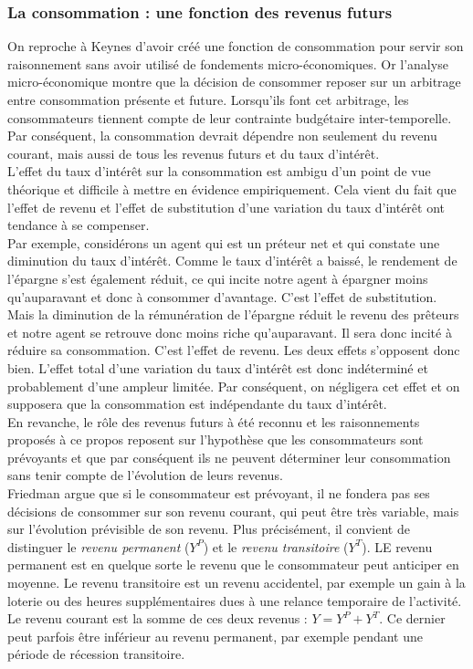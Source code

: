 \documentclass[10pt]{book}
\begin{document}
\subsubsection{La consommation : une fonction des revenus futurs}
On reproche à Keynes d'avoir créé une fonction de consommation pour servir son raisonnement sans avoir utilisé de fondements micro-économiques. Or l'analyse micro-économique montre que la décision de consommer reposer sur un arbitrage entre consommation présente et future. Lorsqu'ils font cet arbitrage, les consommateurs tiennent compte de leur contrainte budgétaire inter-temporelle. Par conséquent, la consommation devrait dépendre non seulement du revenu courant, mais aussi de tous les revenus futurs et du taux d'intérêt. \\
L'effet du taux d'intérêt sur la consommation est ambigu d'un point de vue théorique et difficile à mettre en évidence empiriquement. Cela vient du fait que l'effet de revenu et l'effet de substitution d'une variation du taux d'intérêt ont tendance à se compenser. \\
Par exemple, considérons un agent qui est un préteur net et qui constate une diminution du taux d'intérêt. Comme le taux d'intérêt a baissé, le rendement de l'épargne s'est également réduit, ce qui incite notre agent à épargner moins qu'auparavant et donc à consommer d'avantage. C'est l'effet de substitution. Mais la diminution de la rémunération de l'épargne réduit le revenu des prêteurs et notre agent se retrouve donc moins riche qu'auparavant. Il sera donc incité à réduire sa consommation. C'est l'effet de revenu. Les deux effets s'opposent donc bien. L'effet total d'une variation du taux d'intérêt est donc indéterminé et probablement d'une ampleur limitée. Par conséquent, on négligera cet effet et on supposera que la consommation est indépendante du taux d'intérêt. \\
En revanche, le rôle des revenus futurs à été reconnu et les raisonnements proposés à ce propos reposent sur l'hypothèse que les consommateurs sont prévoyants et que par conséquent ils ne peuvent déterminer leur consommation sans tenir compte de l'évolution de leurs revenus. \\
Friedman argue que si le consommateur est prévoyant, il ne fondera pas ses décisions de consommer sur son revenu courant, qui peut être très variable, mais sur l'évolution prévisible de son revenu. Plus précisément, il convient de distinguer le \textit{revenu permanent} ($Y^P$) et le \textit{revenu transitoire} ($Y^T$). LE revenu permanent est en quelque sorte le revenu que le consommateur peut anticiper en moyenne. Le revenu transitoire est un revenu accidentel, par exemple un gain à la loterie ou des heures supplémentaires dues à une relance temporaire de l'activité. Le revenu courant est la somme de ces deux revenus : $Y = Y^P + Y^T$. Ce dernier peut parfois être inférieur au revenu permanent, par exemple pendant une période de récession transitoire. \\
\end{document}
